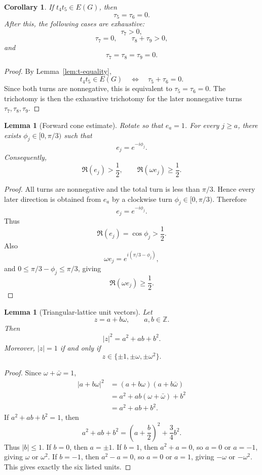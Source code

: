 \documentclass[11pt]{article}
\newtheorem{lemma}[theorem]{Lemma}
\newtheorem{corollary}[theorem]{Corollary}
\begin{document}
\begin{corollary}\label{cor:t4t5}
If $t_4t_5\in E(G)$, then
\[
 \tau_5=\tau_6=0.
\]
After this, the following cases are exhaustive:
\[
 \tau_7>0,
\]
\[
 \tau_7=0,\qquad \tau_8+\tau_9>0,
\]
and
\[
 \tau_7=\tau_8=\tau_9=0.
\]
\end{corollary}

\begin{proof}
By Lemma~\ref{lem:t-equality},
\[
 t_4t_5\in E(G)
 \quad\Longleftrightarrow\quad
 \tau_5+\tau_6=0.
\]
Since both turns are nonnegative, this is equivalent to $\tau_5=\tau_6=0$. The trichotomy is then the exhaustive trichotomy for the later nonnegative turns $\tau_7,\tau_8,\tau_9$.
\end{proof}

\begin{lemma}[Forward cone estimate]\label{lem:cone}
Rotate so that $e_a=1$. For every $j\ge a$, there exists $\phi_j\in[0,\pi/3)$ such that
\[
 e_j=e^{-i\phi_j}.
\]
Consequently,
\[
 \Re(e_j)>\frac12,
 \qquad
 \Re(\omega e_j)\ge\frac12.
\]
\end{lemma}

\begin{proof}
All turns are nonnegative and the total turn is less than $\pi/3$. Hence every later direction is obtained from $e_a$ by a clockwise turn $\phi_j\in[0,\pi/3)$. Therefore
\[
 e_j=e^{-i\phi_j}.
\]
Thus
\[
 \Re(e_j)=\cos\phi_j>\frac12.
\]
Also
\[
 \omega e_j=e^{i(\pi/3-\phi_j)},
\]
and $0\le \pi/3-\phi_j\le \pi/3$, giving
\[
 \Re(\omega e_j)\ge\frac12.
\]
\end{proof}

\begin{lemma}[Triangular-lattice unit vectors]\label{lem:lattice-units}
Let
\[
 z=a+b\omega,
 \qquad a,b\in\mathbb Z.
\]
Then
\[
 |z|^2=a^2+ab+b^2.
\]
Moreover, $|z|=1$ if and only if
\[
 z\in\{\pm1,\pm\omega,\pm\omega^2\}.
\]
\end{lemma}

\begin{proof}
Since $\omega+\bar\omega=1$,
\[
\begin{aligned}
 |a+b\omega|^2
 &=(a+b\omega)(a+b\bar\omega)\\
 &=a^2+ab(\omega+\bar\omega)+b^2\\
 &=a^2+ab+b^2.
\end{aligned}
\]
If $a^2+ab+b^2=1$, then
\[
 a^2+ab+b^2=\left(a+\frac b2\right)^2+\frac34 b^2.
\]
Thus $|b|\le1$. If $b=0$, then $a=\pm1$. If $b=1$, then $a^2+a=0$, so $a=0$ or $a=-1$, giving $\omega$ or $\omega^2$. If $b=-1$, then $a^2-a=0$, so $a=0$ or $a=1$, giving $-\omega$ or $-\omega^2$. This gives exactly the six listed units.
\end{proof}
\end{document}
